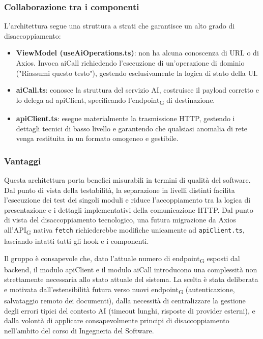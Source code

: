 \documentclass[11pt,a4paper]{article}
\newcommand{\gls}[1]{#1\textsubscript{G}}
\begin{document}
\subsubsection{Collaborazione tra i componenti}
L'architettura segue una struttura a strati che garantisce un alto grado di disaccoppiamento:
\begin{itemize}
    \item \textbf{ViewModel (useAiOperations.ts)}: non ha alcuna conoscenza di URL o di Axios. Invoca aiCall richiedendo l'esecuzione di un'operazione di dominio ("Riassumi questo testo"), gestendo esclusivamente la logica di stato della UI.
    \item \textbf{aiCall.ts}: conosce la struttura del servizio AI, costruisce il payload corretto e lo delega ad apiClient, specificando l'\gls{endpoint} di destinazione.
    \item \textbf{apiClient.ts}: esegue materialmente la trasmissione HTTP, gestendo i dettagli tecnici di basso livello e garantendo che qualsiasi anomalia di rete venga restituita in un formato omogeneo e gestibile.
\end{itemize}

\subsubsection{Vantaggi}
Questa architettura porta benefici misurabili in termini di qualità del software. Dal punto di vista della testabilità, la separazione in livelli distinti facilita l'esecuzione dei test dei singoli moduli e riduce l'accoppiamento tra la logica di presentazione e i dettagli implementativi della comunicazione HTTP. Dal punto di vista del disaccoppiamento tecnologico, una futura migrazione da Axios all'\gls{API} nativa \texttt{fetch} richiederebbe modifiche unicamente ad \texttt{apiClient.ts}, lasciando intatti tutti gli hook e i componenti.

Il gruppo è consapevole che, dato l'attuale numero di \gls{endpoint} esposti dal backend, il modulo apiClient e il modulo aiCall introducono una complessità non strettamente necessaria allo stato attuale del sistema. La scelta è stata deliberata e motivata dall'estensibilità futura verso nuovi \gls{endpoint} (autenticazione, salvataggio remoto dei documenti), dalla necessità di centralizzare la gestione degli errori tipici del contesto AI (timeout lunghi, risposte di provider esterni), e dalla volontà di applicare consapevolmente principi di disaccoppiamento nell'ambito del corso di Ingegneria del Software.
\end{document}
